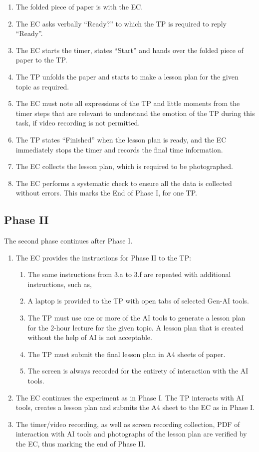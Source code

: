 \begin{enumerate}
    \item The folded piece of paper is with the EC.
    \item The EC asks verbally “Ready?” to which the TP is required to reply “Ready”.
    \item The EC starts the timer, states “Start” and hands over the folded piece of paper to the TP.
    \item The TP unfolds the paper and starts to make a lesson plan for the given topic as required.
    \item The EC must note all expressions of the TP and little moments from the timer steps that are relevant to understand the emotion of the TP during this task, if video recording is not permitted.
    \item The TP states “Finished” when the lesson plan is ready, and the EC immediately stops the timer and records the final time information.
    \item The EC collects the lesson plan, which is required to be photographed.
    \item The EC performs a systematic check to ensure all the data is collected without errors. This marks the End of Phase I, for one TP.
\end{enumerate}

\subsection{Phase II}
The second phase continues after Phase I.
\begin{enumerate}
    \item The EC provides the instructions for Phase II to the TP:
    \begin{enumerate}
        \item The same instructions from 3.a to 3.f are repeated with additional instructions, such as,
        \item A laptop is provided to the TP with open tabs of selected Gen-AI tools.\item The TP must use one or more of the AI tools to generate a lesson plan for the 2-hour lecture for the given topic. A lesson plan that is created without the help of AI is not acceptable.
        \item The TP must submit the final lesson plan in A4 sheets of paper.
        \item The screen is always recorded for the entirety of interaction with the AI tools.
    \end{enumerate}
    \item The EC continues the experiment as in Phase I. The TP interacts with AI tools, creates a lesson plan and submits the A4 sheet to the EC as in Phase I.
    \item The timer/video recording, as well as screen recording collection, PDF of interaction with AI tools and photographs of the lesson plan are verified by the EC, thus marking the end of Phase II.
\end{enumerate}

